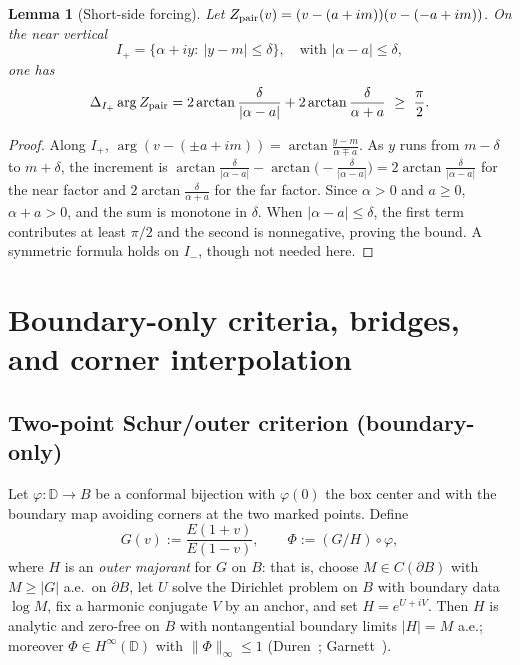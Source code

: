 \documentclass[11pt]{article}
\numberwithin{equation}{section}
\newtheorem{lemma}[theorem]{Lemma}
\theoremstyle{remark}
\newcommand{\D}{\mathbb{D}}
\begin{document}
\begin{lemma}[Short-side forcing]\label{lem:short-side}
Let $Z_{\rm pair}(v)=(v-(a+im))(v-(-a+im))$. On the near vertical
\[
I_+=\{\alpha+i y:\ |y-m|\le \delta\},\quad\text{with }|\alpha-a|\le\delta,
\]
one has
\begin{equation}\label{eq:short-side}
\Delta_{I_+}\arg Z_{\rm pair}
=2\arctan\frac{\delta}{|\alpha-a|}+2\arctan\frac{\delta}{\alpha+a}\ \ge\ \frac{\pi}{2}.
\end{equation}
\end{lemma}
\begin{proof}
Along $I_+$, $\arg(v-(\pm a+im))=\arctan\!\frac{y-m}{\alpha\mp a}$. As $y$ runs from $m-\delta$ to $m+\delta$, the increment is $\arctan\frac{\delta}{|\alpha-a|}-\arctan\!\Big(-\frac{\delta}{|\alpha-a|}\Big)=2\arctan\frac{\delta}{|\alpha-a|}$ for the near factor and $2\arctan\frac{\delta}{\alpha+a}$ for the far factor. Since $\alpha>0$ and $a\ge0$, $\alpha+a>0$, and the sum is monotone in $\delta$. When $|\alpha-a|\le\delta$, the first term contributes at least $\pi/2$ and the second is nonnegative, proving the bound. A symmetric formula holds on $I_-$, though not needed here.
\end{proof}

\section{Boundary-only criteria, bridges, and corner interpolation}\label{sec:criteria}

\subsection{Two-point Schur/outer criterion (boundary-only)}\label{subsec:schur-criterion}

Let $\varphi:\D\to B$ be a conformal bijection with $\varphi(0)$ the box center and with the boundary map avoiding corners at the two marked points. Define
\begin{equation}\label{eq:schur-def}
G(v):=\frac{E(1+v)}{E(1-v)},\qquad \Phi:=(G/H)\circ\varphi,
\end{equation}
where $H$ is an \emph{outer majorant} for $G$ on $B$: that is, choose $M\in C(\partial B)$ with $M\ge |G|$ a.e.\ on $\partial B$, let $U$ solve the Dirichlet problem on $B$ with boundary data $\log M$, fix a harmonic conjugate $V$ by an anchor, and set $H=e^{U+iV}$. Then $H$ is analytic and zero-free on $B$ with nontangential boundary limits $|H|=M$ a.e.; moreover $\Phi\in H^\infty(\D)$ with $\|\Phi\|_\infty\le 1$ (Duren~\cite[§II.5]{DurenHp}; Garnett~\cite[§II.2]{GarnettBAF}). %
\end{document}
